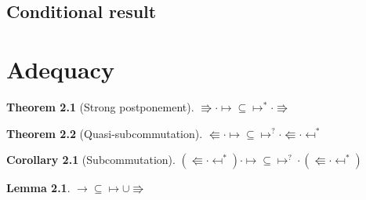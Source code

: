 \documentclass[a4paper, 11pt,titlepage, openright, twoside]{report}
\newcommand{\+}{\enspace}
\newtheorem{corollary}{Corollary}
\newtheorem{lemma}{Lemma}
\newtheorem{theorem}{Theorem}
\begin{document}
\section{Conditional result}


\chapter{Adequacy}

\begin{theorem}[Strong postponement]
	${\Rrightarrow · ↦} ⊆ {↦^* · \Rrightarrow}$
\end{theorem}

\begin{theorem}[Quasi-subcommutation]
	${\Lleftarrow · ↦ } ⊆ {↦^? · \Lleftarrow · \mapsfrom^*}$
\end{theorem}
\begin{corollary}[Subcommutation]
	${(\Lleftarrow · \mapsfrom^*) · ↦} ⊆ {↦^? \mathbin{·} ({{\Lleftarrow} · \mapsfrom^*})}$
\end{corollary}



\begin{lemma}
	${→} ⊆ {↦ ∪ \Rrightarrow}$
\end{lemma}
\end{document}

